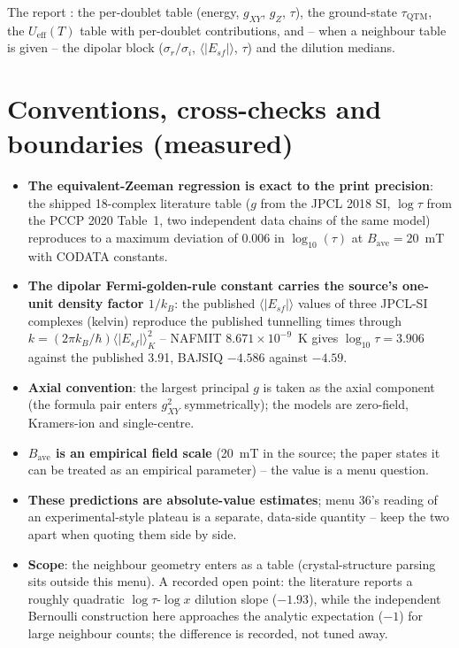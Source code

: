 The report : the per-doublet table (energy,
$g_{XY}$, $g_Z$, $\tau$), the ground-state $\tau_{\mathrm{QTM}}$, the
$U_{\mathrm{eff}}(T)$ table with per-doublet contributions, and -- when a
neighbour table is given -- the dipolar block ($\sigma_r/\sigma_i$,
$\langle|E_{sf}|\rangle$, $\tau$) and the dilution medians.

\section{Conventions, cross-checks and boundaries (measured)}

\begin{readbox}
\begin{itemize}
  \item \textbf{The equivalent-Zeeman regression is exact to the print
    precision}: the shipped 18-complex literature table ($g$ from the
    JPCL 2018 SI, $\log\tau$ from the PCCP 2020 Table~1, two independent
    data chains of the same model) reproduces to a maximum deviation of
    0.006 in $\log_{10}(\tau)$ at $B_{\mathrm{ave}} = 20$~mT with CODATA
    constants.
  \item \textbf{The dipolar Fermi-golden-rule constant carries the
    source's one-unit density factor $1/k_B$}: the published
    $\langle|E_{sf}|\rangle$ values of three JPCL-SI complexes (kelvin)
    reproduce the published tunnelling times through
    $k = (2\pi k_B/\hbar)\langle|E_{sf}|\rangle_K^2$ -- NAFMIT
    $8.671\times10^{-9}$~K gives $\log_{10}\tau = 3.906$ against the
    published 3.91, BAJSIQ $-4.586$ against $-4.59$.
  \item \textbf{Axial convention}: the largest principal $g$ is taken as
    the axial component (the formula pair enters $g_{XY}^2$
    symmetrically); the models are zero-field, Kramers-ion and
    single-centre.
  \item \textbf{$B_{\mathrm{ave}}$ is an empirical field scale} (20~mT in
    the source; the paper states it can be treated as an empirical
    parameter) -- the value is a menu question.
  \item \textbf{These predictions are absolute-value estimates}; menu
    36's reading of an experimental-style plateau is a separate,
    data-side quantity -- keep the two apart when quoting them side by
    side.
  \item \textbf{Scope}: the neighbour geometry enters as a
    table (crystal-structure parsing sits outside this menu).  A recorded open
    point: the literature reports a roughly quadratic
    $\log\tau$-$\log x$ dilution slope ($-1.93$), while the independent
    Bernoulli construction here approaches the analytic expectation
    ($-1$) for large neighbour counts; the difference is recorded, not
    tuned away.
\end{itemize}
\end{readbox}

